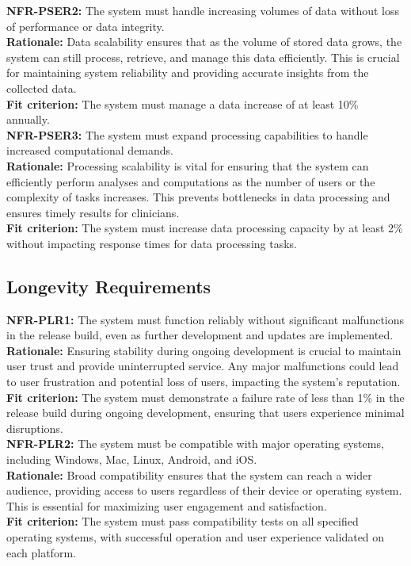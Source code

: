 \documentclass[12pt]{article}
\begin{document}
\noindent\textbf{NFR-PSER2: }The system must handle increasing volumes of data without loss of performance or data integrity.\\
\textbf{Rationale: }Data scalability ensures that as the volume of stored data grows, the system can still process, retrieve, and manage this data efficiently. This is crucial for maintaining system reliability and providing accurate insights from the collected data.\\
\textbf{Fit criterion: }The system must manage a data increase of at least 10\% annually.\\

\noindent\textbf{NFR-PSER3: }The system must expand processing capabilities to handle increased computational demands.\\
\textbf{Rationale: }Processing scalability is vital for ensuring that the system can efficiently perform analyses and computations as the number of users or the complexity of tasks increases. This prevents bottlenecks in data processing and ensures timely results for clinicians.\\
\textbf{Fit criterion: }The system must increase data processing capacity by at least 2\% without impacting response times for data processing tasks.\\

\subsection{Longevity Requirements}

\noindent\textbf{NFR-PLR1: }The system must function reliably without significant malfunctions in the release build, even as further development and updates are implemented.\\
\textbf{Rationale: }Ensuring stability during ongoing development is crucial to maintain user trust and provide uninterrupted service. Any major malfunctions could lead to user frustration and potential loss of users, impacting the system's reputation.\\
\textbf{Fit criterion: }The system must demonstrate a failure rate of less than 1\% in the release build during ongoing development, ensuring that users experience minimal disruptions.\\

\noindent\textbf{NFR-PLR2: }The system must be compatible with major operating systems, including Windows, Mac, Linux, Android, and iOS.\\
\textbf{Rationale: }Broad compatibility ensures that the system can reach a wider audience, providing access to users regardless of their device or operating system. This is essential for maximizing user engagement and satisfaction.\\
\textbf{Fit criterion: }The system must pass compatibility tests on all specified operating systems, with successful operation and user experience validated on each platform.\\
\end{document}
